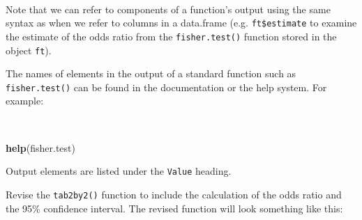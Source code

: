 \documentclass[12pt,a4paper]{book}
\newenvironment{Shaded}{\begin{snugshade}}{\end{snugshade}}
\newcommand{\KeywordTok}[1]{\textcolor[rgb]{0.13,0.29,0.53}{\textbf{#1}}}
\newcommand{\NormalTok}[1]{#1}
\theoremstyle{definition}
\theoremstyle{definition}
\theoremstyle{definition}
\theoremstyle{remark}
\begin{document}
~

Note that we can refer to components of a function's output using the
same syntax as when we refer to columns in a data.frame (e.g.
\texttt{ft\$estimate} to examine the estimate of the odds ratio from the
\texttt{fisher.test()} function stored in the object \texttt{ft}).

The names of elements in the output of a standard function such as
\texttt{fisher.test()} can be found in the documentation or the help
system. For example:

~

\begin{Shaded}
\begin{Highlighting}[]
\KeywordTok{help}\NormalTok{(fisher.test)}
\end{Highlighting}
\end{Shaded}

\newpage

Output elements are listed under the \texttt{Value} heading.

Revise the \texttt{tab2by2()} function to include the calculation of the
odds ratio and the 95\% confidence interval. The revised function will
look something like this:

~
\end{document}
